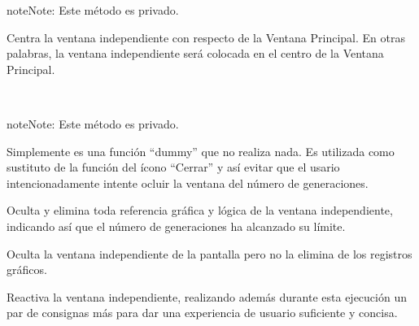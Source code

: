 \documentclass[class=report, crop=false]{standalone}
\begin{document}
\begin{fulllineitems}
\begin{fulllineitems}
\begin{notice}{note}{Note:}
Este método es privado.
\end{notice}

Centra la ventana independiente con respecto de la 
Ventana Principal.\break
En otras palabras, la ventana independiente será 
colocada en el centro de la Ventana Principal.

\end{fulllineitems}

\begin{fulllineitems}

~

\begin{notice}{note}{Note:}
Este método es privado.
\end{notice}

Simplemente es una función ``dummy'' que no realiza 
nada.\break
Es utilizada como sustituto de la función del ícono 
``Cerrar'' y así evitar que el usario intencionadamente 
intente ocluir la ventana del número de generaciones.

\end{fulllineitems}

\begin{fulllineitems}

Oculta y elimina toda referencia gráfica y lógica de la 
ventana independiente, indicando así que el número de 
generaciones ha alcanzado su límite.

\end{fulllineitems}

\begin{fulllineitems}

Oculta la ventana independiente de la pantalla pero no 
la elimina de los registros gráficos.

\end{fulllineitems}

\begin{fulllineitems}

Reactiva la ventana independiente, realizando 
además durante esta ejecución un par de consignas 
más para dar una experiencia de usuario suficiente 
y concisa.


\end{fulllineitems}
\end{fulllineitems}
\end{document}
